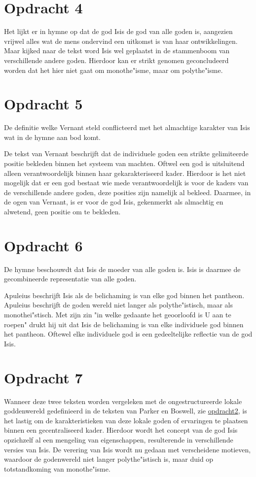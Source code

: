 \documentclass[10pt]{amsart}
\begin{document}
\section*{Opdracht 4}
Het lijkt er in hymne op dat de god Isis de god van alle goden is, aangezien vrijwel alles wat de mens ondervind een uitkomst is van haar ontwikkelingen.
Maar kijked naar de tekst word Isis wel geplaatst in de stammenboom van verschillende andere goden. Hierdoor kan er strikt genomen geconcludeerd worden dat het hier niet gaat om monothe"isme, maar om polythe"isme.

\section*{Opdracht 5}
De definitie welke Vernant\autocite{vernantGreceAncienneEtude1976} steld conflicteerd met het almachtige karakter van Isis wat in de hymne\autocite{i.AretologieVanIsis} aan bod komt.

De tekst van Vernant beschrijft dat de individuele goden een strikte gelimiteerde positie bekleden binnen het systeem van machten. Oftwel een god is uitsluitend alleen verantwoordelijk binnen haar gekarakteriseerd kader. Hierdoor is het niet mogelijk dat er een god bestaat wie mede verantwoordelijk is voor de kaders van de verschillende andere goden, deze posities zijn namelijk al bekleed. Daarmee, in de ogen van Vernant, is er voor de god Isis, gekenmerkt als almachtig en alwetend, geen positie om te bekleden. 

\section*{Opdracht 6}

De hymne\autocite{vanderlipHymneVoorIsis1972} beschouwdt dat Isis de moeder van alle goden is. Isis is daarmee de gecombineerde representatie van alle goden.

Apuleius\autocite{apuleiusMetamorphoses02eeeuwn.Chr.} beschrijft Isis als de belichaming is van elke god binnen het pantheon. Apuleius beschrijft de goden wereld niet langer als polythe"istisch, maar als monothei"stisch. Met zijn zin "in welke gedaante het geoorloofd is U aan te roepen" drukt hij uit dat Isis de belichaming is van elke individuele god binnen het pantheon. Oftewel elke individuele god is een gedeeltelijke reflectie van de god Isis.

\section*{Opdracht 7}
Wanneer deze twee teksten worden vergeleken met de ongestructureerde lokale goddenwereld gedefinieerd in de teksten van Parker en Boswell, zie \hyperref[Opdracht 2]{opdracht2}, is het lastig om de karakteristieken van deze lokale goden of ervaringen te plaatsen binnen een gecentraliseerd kader. Hierdoor wordt het concept van de god Isis opzichzelf al een mengeling van eigenschappen, resulterende in verschillende versies van Isis. De verering van Isis wordt nu gedaan met verscheidene motieven, waardoor de godenwereld niet langer polythe"istisch is, maar duid op totstandkoming van monothe"isme.
\end{document}
